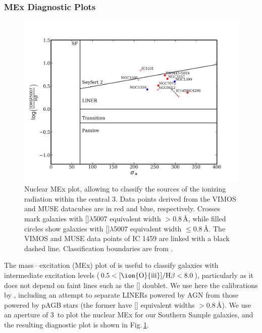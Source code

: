 \documentclass[a4paper,fleqn,usenatbib]{mnras}
\begin{document}
			


		\subsubsection{MEx Diagnostic Plots}
			\label{subsubsec:MEx}
			\begin{figure}
				\includegraphics[width=\columnwidth]{nuclear_MEx.png}
				\caption{Nuclear MEx plot, allowing to classify the sources of the ionizing radiation within the central 3\arcsec. Data points derived from the VIMOS and MUSE datacubes are in red and blue, respectively. Crosses mark galaxies with []$\lambda$5007 equivalent width $> 0.8$\,\AA, while filled circles show galaxies with []$\lambda$5007 equivalent width $\leqslant 0.8$\,\AA. The VIMOS and MUSE data points of IC 1459 are linked with a black dashed line. Classification boundaries are from \citet{Nyland2016}.}
				\label{fig:MEx}
			\end{figure}

			The mass\,--\,excitation (MEx) plot of \citet{Juneau2011} is useful to classify galaxies with intermediate excitation levels ($0.5 < \mathrm{[\ion{O}{iii}]/H\beta} < 8.0$), particularly as it does not depend on faint lines such as the [] doublet. We use here the calibrations by \citet{Nyland2016}, including an attempt to separate LINERs powered by AGN from those powered by pAGB stars (the former have [] equivalent widths $>0.8$\,\AA). We use an aperture of 3\arcsec\ to plot the nuclear MEx for our Southern Sample galaxies, and the resulting diagnostic plot is shown in Fig.\,\ref{fig:MEx}. 
\end{document}
